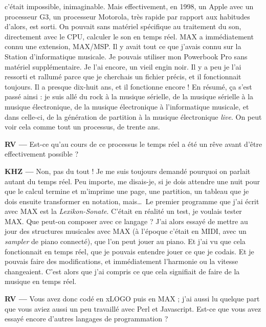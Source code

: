 \documentclass[a4paper,12pt]{article}
\begin{document}
c'était impossible, inimaginable. Mais effectivement, en 1998, un Apple avec un processeur G3, un processeur Motorola, très rapide par rapport aux habitudes d'alors, est sorti. On pouvait sans matériel spécifique au traitement du son, directement avec le CPU, calculer le son en temps réel. MAX a immédiatement connu une extension, MAX/MSP. Il y avait tout ce que j'avais connu sur la Station d'informatique musicale. Je pouvais utiliser mon Powerbook Pro sans matériel supplémentaire. Je l'ai encore, un vieil engin noir. Il y a peu je l'ai ressorti et rallumé parce que je cherchais un fichier précis, et il fonctionnait toujours. Il a presque dix-huit ans, et il fonctionne encore ! En résumé, ça s'est passé ainsi : je suis allé du rock à la musique sérielle, de la musique sérielle à la musique électronique, de la musique électronique à l'informatique musicale, et dans celle-ci, de la génération de partition à la musique électronique \emph{live}. On peut voir cela comme tout un processus, de trente ans.

\textbf{RV ---} Est-ce qu'au cours de ce processus le temps réel a été un rêve avant d'être effectivement possible ?

\textbf{KHZ ---} Non, pas du tout ! Je me suis toujours demandé pourquoi on parlait autant du temps réel. Peu importe, me disais-je, si je dois attendre une nuit pour que le calcul termine et m'imprime une page, une partition, un tableau que je dois ensuite transformer en notation, mais\dots~Le premier programme que j'ai écrit avec MAX est la \emph{Lexikon-Sonate}. C'était en réalité un test, je voulais tester MAX. Que peut-on composer avec ce langage ? J'ai alors essayé de mettre au jour des structures musicales avec MAX (à l'époque c'était en MIDI, avec un \emph{sampler} de piano connecté), que l'on peut jouer au piano. Et j'ai vu que cela fonctionnait en temps réel, que je pouvais entendre jouer ce que je codais. Et je pouvais faire des modifications, et immédiatement l'harmonie ou la vitesse changeaient. C'est alors que j'ai compris ce que cela signifiait de faire de la musique en temps réel.

\textbf{RV ---} Vous avez donc codé en xLOGO puis en MAX ; j'ai aussi lu quelque part que vous aviez aussi un peu travaillé avec Perl et Javascript. Est-ce que vous avez essayé encore d'autres langages de programmation ?
\end{document}
